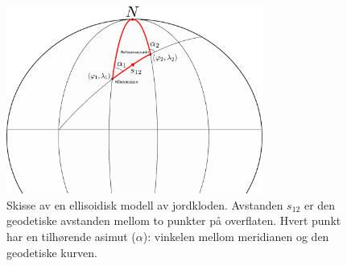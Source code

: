 \begin{figure}
    \centering
    \includegraphics[width=0.75\textwidth]{img/ellipsoidal_problem.pdf}
        \caption{Skisse av en ellisoidisk modell av jordkloden. Avstanden $s_{12}$ er den geodetiske avstanden mellom to punkter på overflaten. Hvert punkt har en tilhørende asimut ($\alpha$): vinkelen mellom meridianen og den geodetiske kurven.}
    \label{fig:inverse_problem}
\end{figure}
